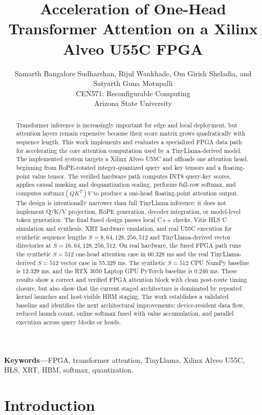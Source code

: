 \documentclass[conference]{IMSTemplate}
\title{Acceleration of One-Head Transformer Attention on a Xilinx Alveo U55C FPGA}
\author{Samarth Bangalore Sudharshan, Rijul Wankhade, Om Girish Sheladia, and
Satyarth Guna Motupalli\\
CEN571: Reconfigurable Computing\\
Arizona State University}
\begin{document}
\maketitle

\begin{abstract}
Transformer inference is increasingly important for edge and local deployment,
but attention layers remain expensive because their score matrix grows
quadratically with sequence length. This work implements and evaluates a
specialized FPGA data path for accelerating the core attention computation used
by a TinyLlama-derived model. The implemented system targets a Xilinx Alveo
U55C and offloads one attention head, beginning from RoPE-rotated
integer-quantized query and key tensors and a floating-point value tensor. The
verified hardware path computes INT8 query-key scores, applies causal masking
and dequantization scaling, performs full-row softmax, and computes
\(\mathrm{softmax}(QK^T)V\) to produce a one-head floating-point attention
output. The design is intentionally narrower than full TinyLlama inference: it
does not implement Q/K/V projection, RoPE generation, decoder integration, or
model-level token generation. The final fused design passes local C++ checks,
Vitis HLS C simulation and synthesis, XRT hardware emulation, and real U55C
execution for synthetic sequence lengths \(S=8,64,128,256,512\) and
TinyLlama-derived vector directories at \(S=16,64,128,256,512\). On real
hardware, the fused FPGA path runs the synthetic \(S=512\) one-head attention
case in 60.328 ms and the real TinyLlama-derived \(S=512\) vector case in
55.329 ms. The synthetic \(S=512\) CPU NumPy baseline is 12.329 ms, and the RTX
3050 Laptop GPU PyTorch baseline is 0.246 ms. These results show a correct and
verified FPGA attention block with clean post-route timing closure, but also
show that the current staged architecture is dominated by repeated kernel
launches and host-visible HBM staging. The work establishes a validated
baseline and identifies the next architectural improvements: device-resident
data flow, reduced launch count, online softmax fused with value accumulation,
and parallel execution across query blocks or heads.
\end{abstract}

\noindent\textbf{Keywords---}FPGA, transformer attention, TinyLlama, Xilinx
Alveo U55C, HLS, XRT, HBM, softmax, quantization.

\section{Introduction}
\end{document}
